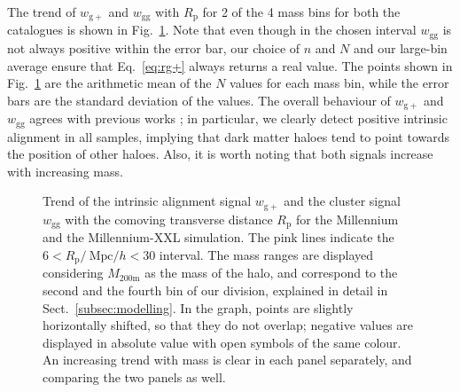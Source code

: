 \documentclass[a4paper,fleqn,usenatbib]{mnras}
\begin{document}
The trend of $w_{\mathrm{g+}}$ and $w_{\mathrm{gg}}$ with $R_{\mathrm{p}}$ for 2 of the 4 mass bins for both the catalogues is shown in Fig.~\ref{fig:wgpwggrp}. Note that even though in the chosen interval $w_{\mathrm{gg}}$ is not always positive within the error bar, our choice of $n$ and $N$ and our large-bin average ensure that Eq.~\ref{eq:rg+} always returns a real value. The points shown in Fig.~\ref{fig:wgpwggrp} are the arithmetic mean of the $N$ values for each mass bin, while the error bars are the standard deviation of the values. The overall behaviour of $w_{\mathrm{g+}}$ and $w_{\mathrm{gg}}$ agrees with previous works \citep{Joachimietal2011, vanUitertJoachimi2017}; in particular, we clearly detect positive intrinsic alignment in all samples, implying that dark matter haloes tend to point towards the position of other haloes. Also, it is worth noting that both signals increase with increasing mass.
\begin{figure}
	\centerline{
	}
	\centerline{
	}
	\caption{Trend of the intrinsic alignment signal $w_{\mathrm{g+}}$ and the cluster signal $w_{\mathrm{gg}}$ with the comoving transverse distance $R_{\mathrm{p}}$ for \protect{} the Millennium and \protect{} the Millennium-XXL simulation. The pink lines indicate the $6 < R_{\mathrm{p}} / \ \mbox{Mpc}/h < 30 $ interval. The mass ranges are displayed considering $M_{\mathrm{200m}}$ as the mass of the halo, and correspond to the second and the fourth bin of our division, explained in detail in Sect.~\ref{subsec:modelling}. In the graph, points are slightly horizontally shifted, so that they do not overlap; negative values are displayed in absolute value with open symbols of the same colour. An increasing trend with mass is clear in each panel separately, and comparing the two panels as well.}
	\label{fig:wgpwggrp}
\end{figure}
\end{document}

